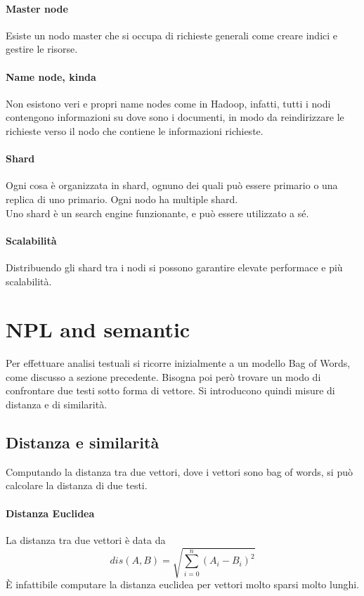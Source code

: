 \paragraph{Master node}
Esiste un nodo master che si occupa di richieste 
generali come creare indici e gestire le risorse.

\paragraph{Name node, kinda}
Non esistono veri e propri name nodes come in Hadoop, infatti, tutti i nodi contengono
informazioni su dove sono i documenti, in modo da reindirizzare le richieste verso 
il nodo che contiene le informazioni richieste.

\paragraph{Shard}
Ogni cosa è organizzata in shard, ognuno dei quali 
può essere primario o una replica di uno primario.
Ogni nodo ha multiple shard.\\
Uno shard è un search engine funzionante, e può essere utilizzato a sé.

\paragraph{Scalabilità}
Distribuendo gli shard tra i nodi si possono garantire elevate performace
e più scalabilità.

\section{NPL and semantic}
Per effettuare analisi testuali si ricorre inizialmente a un modello Bag of Words, 
come discusso a sezione precedente. Bisogna poi però trovare un modo di confrontare due 
testi sotto forma di vettore. Si introducono quindi misure di distanza e di similarità.

\subsection{Distanza e similarità}
Computando la distanza tra due vettori, dove i vettori sono bag of words, si può 
calcolare la distanza di due testi.

\paragraph{Distanza Euclidea}
La distanza tra due vettori è data da
$$
    dis(A, B) = \sqrt{\sum_{i=0}^{n} (A_i - B_i)^2}
$$
È infattibile computare la distanza euclidea per vettori molto sparsi molto lunghi.

